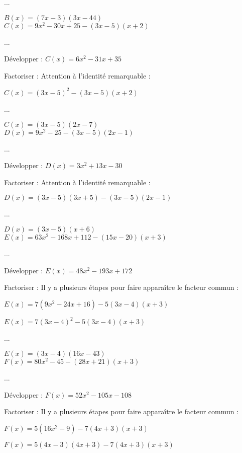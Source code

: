 ... 

$B(x) =\left(7x-3\right)\left(3x-44\right) $ \\

$ C(x) = 9x^2-30x+25-\left(3x-5\right)\left(x+2\right) $

...

Développer : $ C(x) = 6x^2 - 31x + 35 $

Factoriser : Attention à l'identité remarquable :

$ C(x) = \left(3x-5\right)^2-\left(3x-5\right)\left(x+2\right) $

...
 
$ C(x) = \left(3x-5\right)\left(2x-7\right) $ \\

$ D(x) = 9x^2-25-\left(3x-5\right)\left(2x-1\right) $

...

Développer : $ D(x) = 3x^2 + 13x - 30 $

Factoriser : Attention à l'identité remarquable :

$ D(x) = \left(3x-5\right)\left(3x+5\right)-\left(3x-5\right)\left(2x-1\right) $

...

$ D(x) = \left(3x-5\right)\left(x+6\right) $ \\

$ E(x) = 63x^2-168x+112-\left(15x-20\right)\left(x+3\right) $

...

Développer : $ E(x) =48x^2-193x+172 $ 

Factoriser : Il y a plusieurs étapes pour faire apparaître le facteur commun :

$ E(x) =7\left(9x^2-24x+16\right)-5\left(3x-4\right)\left(x+3\right) $

$ E(x) = 7\left(3x-4\right)^2-5\left(3x-4\right)\left(x+3\right) $

...

$ E(x) = \left(3x-4\right)\left(16x-43\right) $ \\

$ F(x) = 80x^2-45-\left(28x+21\right)\left(x+3\right) $

...

Développer : $ F(x) = 52x^2 - 105x - 108 $

Factoriser : Il y a plusieurs étapes pour faire apparaître le facteur commun :

$ F(x) = 5\left(16x^2-9\right)-7\left(4x+3\right)\left(x+3\right) $

$ F(x) = 5\left(4x-3\right)\left(4x+3\right)-7\left(4x+3\right)\left(x+3\right) $

